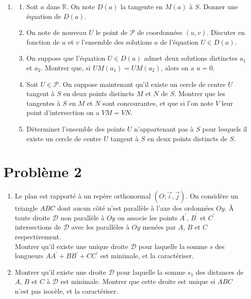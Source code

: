 \documentclass[landscape,twocolumn,leqno,a4paper,10pt]{report} %
\begin{document}
\begin{enumerate}
\begin{enumerate}
		Faire un croquis représentant $S$ et les ensembles trouvés.
	\end{enumerate}
	\item \begin{enumerate}
		\item Soit $a$ dans $\mathbb{R}$. On note $D(a)$ la tangente en $M(a)$ à $S$. Donner une équation de $D(a)$.
		\item On note de nouveau $U$ le point de $\mathscr{P}$ de coordonnées $(u, v)$. Discuter en fonction de $u$ et $v$ l'ensemble des solutions $a$ de l'équation $U \in D(a)$.
		\item On suppose que l'équation $U \in D(a)$ admet deux solutions distinctes $a_{1}$ et $a_{2}$. Montrer que, si $U M\left(a_{1}\right)=U M\left(a_{2}\right)$, alors on a $u=0$.
		\item Soit $U \in \mathscr{P}$. On suppose maintenant qu'il existe un cercle de centre $U$ tangent à $S$ en deux points distincts $M$ et $N$ de $S$. Montrer que les tangentes à $S$ en $M$ et $N$ sont concourantes, et que si l'on note $V$ leur point d'intersection on a $V M=V N$.
		\item Déterminer l'ensemble des points $U$ n'appartenant pas à $S$ pour lesquels il existe un cercle de centre $U$ tangent à $S$ en deux points distincts de $S$.
	\end{enumerate}
\end{enumerate}

\newpage

\section{Problème 2}

\begin{enumerate}
	\item Le plan est rapporté à un repère orthonormal $(O ; \vec{i}, \vec{j})$. On considère un triangle $A B C$ dont aucun côté n'est parallèle à l'axe des ordonnées $O y$. À toute droite $\mathscr{D}$ non parallèle à $O y$ on associe les points $A^{\prime}$, $B^{\prime}$ et $C^{\prime}$ intersections de $\mathscr{D}$ avec les parallèles à $O y$ menées par $A$, $B$ et $C$ respectivement.\\
	Montrer qu'il existe une unique droite $\mathscr{D}$ pour laquelle la somme $s$ des longueurs $A A^{\prime}+B B^{\prime}+C C^{\prime}$ est minimale, et la caractériser.
  \item Montrer qu'il existe une droite $\mathscr{D}$ pour laquelle la somme $s_{1}$ des distances de $A$, $B$ et $C$ à $\mathscr{D}$ est minimale. Montrer que cette droite est unique si $A B C$ n'est pas isocèle, et la caractériser.
\end{enumerate}
\end{document}
